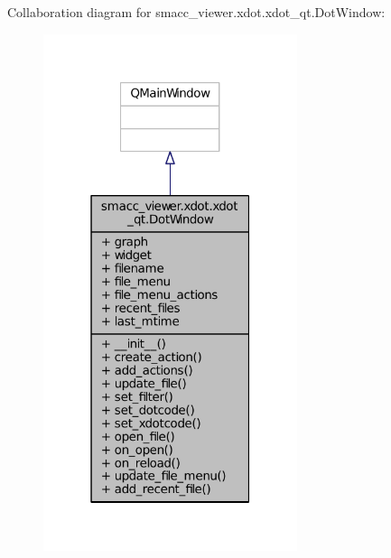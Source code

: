 Collaboration diagram for smacc\+\_\+viewer.\+xdot.\+xdot\+\_\+qt.\+Dot\+Window\+:
\nopagebreak
\begin{figure}[H]
\begin{center}
\leavevmode
\includegraphics[width=211pt]{classsmacc__viewer_1_1xdot_1_1xdot__qt_1_1DotWindow__coll__graph}
\end{center}
\end{figure}
